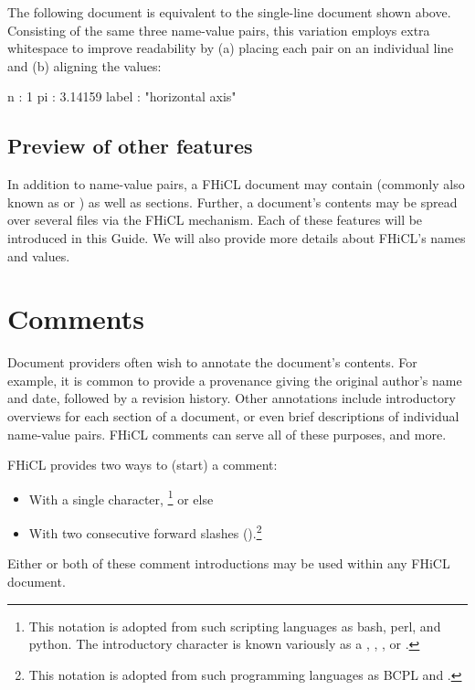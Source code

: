 \documentclass{memarticle}
\newcommand{\fhicl}%
 {FHiCL\xspace}
\begin{document}
The following document
is equivalent to the single-line document shown above.
Consisting of the same three name-value pairs,
this variation employs extra whitespace
to improve readability
by (a) placing each pair on an individual line
and (b) aligning the values:
\Needspace{0.5in}
\begin{fcllisting}[texcl,escapechar=`]
n     : 1
pi    : 3.14159
label : "horizontal axis"
\end{fcllisting}

\section{Preview of other features}

In addition to name-value pairs,
a \fhicl document may contain
 (commonly also known as  or )
as well as  sections.
Further,
a document's contents may be spread over several files
via the \fhicl {} mechanism.
Each of these features will be introduced
in this Guide.
We will also provide more details
about \fhicl{}'s names and values.


\chapter{Comments}

Document providers often wish
to annotate the document's contents.
For example,
it is common to provide a provenance
giving the original author's name and date,
followed by a revision history.
Other annotations include
introductory overviews for each section
of a document,
or even brief descriptions
of individual name-value pairs.
\fhicl comments can serve all of these purposes,
and more.

\fhicl provides two ways to  (start) a comment:
\begin{itemize}
  \item With a single \fclcode{#} character,%
          \footnote{%
          This notation is adopted
          from such scripting languages
          as bash, perl, and python.
          The introductory \fclcode{#} character
          is known variously as a
          ,
          ,
          ,
          or %
          .}
  or else
  \item With two consecutive forward slashes (\fclcode{//}).\footnote{%
          This notation is adopted
          from such programming languages
          as BCPL and \cpp{}%
          .}
\end{itemize}
Either or both of these comment introductions
may be used within any \fhicl document.
\end{document}

